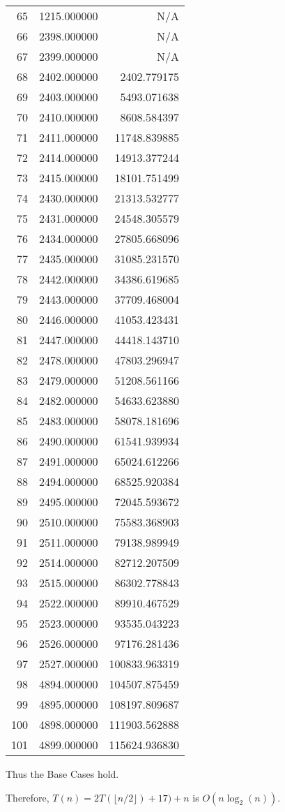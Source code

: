 \documentclass{article}
\begin{document}
\begin{longtable}{r|r|r}
	 65 & 1215.000000 & N/A \\
	 66 & 2398.000000 & N/A \\
	 67 & 2399.000000 & N/A \\
	 68 & 2402.000000 & 2402.779175   \\
	 69 & 2403.000000 & 5493.071638   \\
	 70 & 2410.000000 & 8608.584397   \\
	 71 & 2411.000000 & 11748.839885  \\
	 72 & 2414.000000 & 14913.377244  \\
	 73 & 2415.000000 & 18101.751499  \\
	 74 & 2430.000000 & 21313.532777  \\
	 75 & 2431.000000 & 24548.305579  \\
	 76 & 2434.000000 & 27805.668096  \\
	 77 & 2435.000000 & 31085.231570  \\
	 78 & 2442.000000 & 34386.619685  \\
	 79 & 2443.000000 & 37709.468004  \\
	 80 & 2446.000000 & 41053.423431  \\
	 81 & 2447.000000 & 44418.143710  \\
	 82 & 2478.000000 & 47803.296947  \\
	 83 & 2479.000000 & 51208.561166  \\
	 84 & 2482.000000 & 54633.623880  \\
	 85 & 2483.000000 & 58078.181696  \\
	 86 & 2490.000000 & 61541.939934  \\
	 87 & 2491.000000 & 65024.612266  \\
	 88 & 2494.000000 & 68525.920384  \\
	 89 & 2495.000000 & 72045.593672  \\
	 90 & 2510.000000 & 75583.368903  \\
	 91 & 2511.000000 & 79138.989949  \\
	 92 & 2514.000000 & 82712.207509  \\
	 93 & 2515.000000 & 86302.778843  \\
	 94 & 2522.000000 & 89910.467529  \\
	 95 & 2523.000000 & 93535.043223  \\
	 96 & 2526.000000 & 97176.281436  \\
	 97 & 2527.000000 & 100833.963319 \\
	 98 & 4894.000000 & 104507.875459 \\
	 99 & 4895.000000 & 108197.809687 \\
	100 & 4898.000000 & 111903.562888 \\
	101 & 4899.000000 & 115624.936830 \\
\end{longtable}
\noindent Thus the Base Cases hold.

Therefore, $T(n) = 2T(\lfloor n / 2 \rfloor) + 17) + n$ is $O(n\log_2(n))$.
\end{document}
